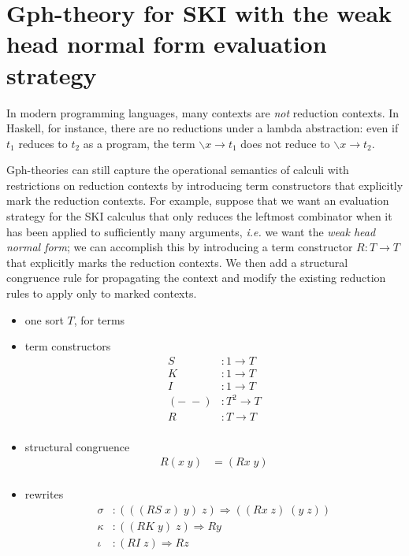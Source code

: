 \documentclass[a4paper,UKenglish]{lipics-v2016}
\newcommand{\maps}{\colon}
\begin{document}
\section{Gph-theory for SKI with the weak head normal form evaluation strategy}
\label{whnf}
In modern programming languages, many contexts are {\em not} reduction contexts.  In Haskell, for instance, there are no reductions under a lambda abstraction: even if $t_1$ reduces to $t_2$ as a program, the term $\backslash x \to t_1$ does not reduce to $\backslash x \to t_2.$

Gph-theories can still capture the operational semantics of calculi with restrictions on reduction contexts by introducing term constructors that explicitly mark the reduction contexts.  For example, suppose that we want an evaluation strategy for the SKI calculus that only reduces the leftmost combinator when it has been applied to sufficiently many arguments, {\em i.e.} we want the {\em weak head normal form}; we can accomplish this by introducing a term constructor $R\maps T \to T$ that explicitly marks the reduction contexts.  We then add a structural congruence rule for propagating the context and modify the existing reduction rules to apply only to marked contexts.

\begin{itemize}
  \item one sort $T$, for terms
  \item term constructors
  \[\begin{array}{rl}
    S&:1 \to T\\
    K&:1 \to T\\
    I&:1 \to T\\
    (-\; -)&: T^2 \to T\\
    R&:T \to T\\
  \end{array}\]
  \item structural congruence
  \[\begin{array}{rl}
    R(x\; y) &= (Rx\; y)\\
  \end{array}\]
  \item rewrites
  \[\begin{array}{rl}
    \sigma&:(((RS\; x)\; y)\; z) \Rightarrow ((Rx\; z)\; (y\; z))\\
    \kappa&:((RK\; y)\; z) \Rightarrow Ry\\
    \iota&:(RI\; z) \Rightarrow Rz\\
  \end{array}\]
\end{itemize}
\end{document}
